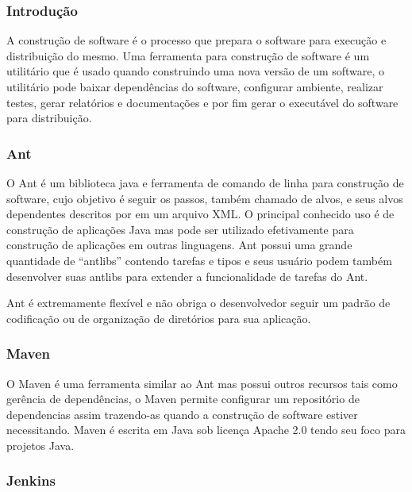 \documentclass[12pt,a4paper]{article}
\begin{document}
		\subsubsection{Introdução}
		
			A construção de software é o processo que prepara o software para execução e distribuição do mesmo. Uma ferramenta
			para construção de software é um utilitário que é usado quando construindo uma nova versão de um software, o
			utilitário pode baixar dependências do software, configurar ambiente, realizar testes, gerar relatórios e
			documentações e por fim gerar o executável do software para distribuição.
			
		\subsubsection{Ant}
		
			O Ant é um biblioteca java e ferramenta de comando de linha para construção de software, cujo objetivo é seguir os
			passos, também chamado de alvos, e seus alvos dependentes descritos por em um arquivo XML. O principal conhecido uso
			é de construção de aplicações Java mas pode ser utilizado efetivamente para construção de aplicações em outras
			linguagens. Ant possui uma grande quantidade de ``antlibs'' contendo tarefas e tipos e seus usuário podem também
			desenvolver suas antlibs para extender a funcionalidade de tarefas do Ant.
			
			Ant é extremamente flexível e não obriga o desenvolvedor seguir um padrão de codificação ou de organização de
			diretórios para sua aplicação.
			
		\subsubsection{Maven}
		
			O Maven é uma ferramenta similar ao Ant mas possui outros recursos tais como gerência de dependências, o Maven
			permite configurar um repositório de dependencias assim trazendo-as quando a construção de software estiver necessitando.
			Maven é escrita em Java sob licença Apache 2.0 tendo seu foco para projetos Java.
			
		\subsubsection{Jenkins}
		
\end{document}
